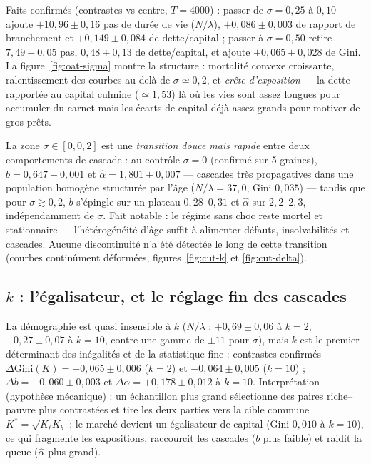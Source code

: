 \documentclass[11pt,a4paper]{article}
\begin{document}
Faits confirmés (contrastes vs centre, $T=4000$) : passer de
$\sigma=0{,}25$ à $0{,}10$ ajoute $+10{,}96\pm0{,}16$ pas de durée de
vie ($N/\lambda$), $+0{,}086\pm0{,}003$ de rapport de branchement et
$+0{,}149\pm0{,}084$ de dette/capital ; passer à $\sigma=0{,}50$
retire $7{,}49\pm0{,}05$ pas, $0{,}48\pm0{,}13$ de dette/capital, et
ajoute $+0{,}065\pm0{,}028$ de Gini. La figure~\ref{fig:oat-sigma}
montre la structure : mortalité convexe croissante, ralentissement des
courbes au-delà de $\sigma\simeq0{,}2$, et \emph{crête d'exposition} —
la dette rapportée au capital culmine ($\simeq1{,}53$) là où les vies
sont assez longues pour accumuler du carnet mais les écarts de capital
déjà assez grands pour motiver de gros prêts.

La zone $\sigma\in[0,0{,}2]$ est une \emph{transition douce mais
rapide} entre deux comportements de cascade : au contrôle $\sigma=0$
(confirmé sur 5 graines), $b=0{,}647\pm0{,}001$ et
$\hat\alpha=1{,}801\pm0{,}007$ — cascades très propagatives dans une
population homogène structurée par l'âge ($N/\lambda=37{,}0$, Gini
$0{,}035$) — tandis que pour $\sigma\gtrsim0{,}2$, $b$ s'épingle sur un
plateau $0{,}28$--$0{,}31$ et $\hat\alpha$ sur $2{,}2$--$2{,}3$,
indépendamment de $\sigma$. Fait notable : le régime sans choc reste
mortel et stationnaire — l'hétérogénéité d'âge suffit à alimenter
défauts, insolvabilités et cascades. Aucune discontinuité n'a été
détectée le long de cette transition (courbes continûment déformées,
figures~\ref{fig:cut-k} et \ref{fig:cut-delta}).

\subsection{$k$ : l'égalisateur, et le réglage fin des cascades}
\label{sec:k}

La démographie est quasi insensible à $k$ ($N/\lambda$ :
$+0{,}69\pm0{,}06$ à $k=2$, $-0{,}27\pm0{,}07$ à $k=10$, contre une
gamme de $\pm11$ pour $\sigma$), mais $k$ est le premier déterminant des
inégalités et de la statistique fine : contrastes confirmés
$\Delta\mathrm{Gini}(K)=+0{,}065\pm0{,}006$ ($k=2$) et
$-0{,}064\pm0{,}005$ ($k=10$) ; $\Delta b=-0{,}060\pm0{,}003$ et
$\Delta\hat\alpha=+0{,}178\pm0{,}012$ à $k=10$. Interprétation
(hypothèse mécanique) : un échantillon plus grand sélectionne des
paires riche--pauvre plus contrastées et tire les deux parties vers la
cible commune $K^\ast=\sqrt{K_\ell K_b}$ ; le marché devient un
égalisateur de capital (Gini $0{,}010$ à $k=10$), ce qui fragmente les
expositions, raccourcit les cascades ($b$ plus faible) et raidit la
queue ($\hat\alpha$ plus grand).
\end{document}
